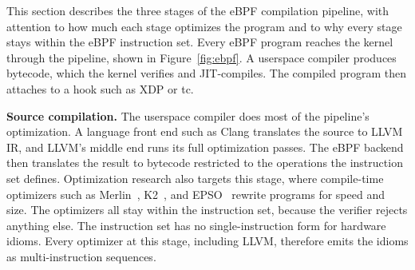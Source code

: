 This section describes the three stages of the eBPF compilation pipeline, with attention to how much each stage optimizes the program and to why every stage stays within the eBPF instruction set.
Every eBPF program reaches the kernel through the pipeline, shown in Figure~\ref{fig:ebpf}.
A userspace compiler produces bytecode, which the kernel verifies and JIT-compiles.
The compiled program then attaches to a hook such as XDP or tc.



\noindent\textbf{Source compilation.}
The userspace compiler does most of the pipeline's optimization.
A language front end such as Clang translates the source to LLVM IR, and LLVM's middle end runs its full optimization passes.
The eBPF backend then translates the result to bytecode restricted to the operations the instruction set defines.
Optimization research also targets this stage, where compile-time optimizers such as Merlin~\cite{mao2024merlin}, K2~\cite{xu2021synthesizing}, and EPSO~\cite{zhu2025epso} rewrite programs for speed and size.
The optimizers all stay within the instruction set, because the verifier rejects anything else.
The instruction set has no single-instruction form for hardware idioms.
Every optimizer at this stage, including LLVM, therefore emits the idioms as multi-instruction sequences.

